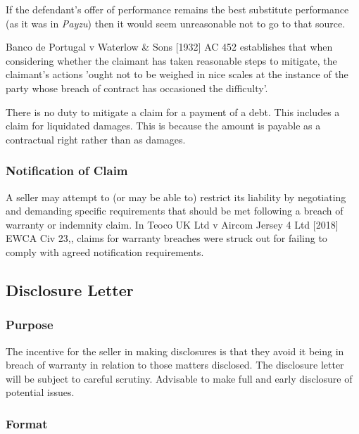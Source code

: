 \documentclass[
]{article}
\begin{document}
If the defendant's offer of performance remains the best substitute
performance (as it was in \emph{Payzu}) then it would seem unreasonable
not to go to that source.

Banco de Portugal v Waterlow \& Sons {[}1932{]} AC 452 establishes that
when considering whether the claimant has taken reasonable steps to
mitigate, the claimant's actions 'ought not to be weighed in nice scales
at the instance of the party whose breach of contract has occasioned the
difficulty'.

There is no duty to mitigate a claim for a payment of a debt. This
includes a claim for liquidated damages. This is because the amount is
payable as a contractual right rather than as damages.

\hypertarget{notification-of-claim}{%
\subsubsection{Notification of Claim}\label{notification-of-claim}}

A seller may attempt to (or may be able to) restrict its liability by
negotiating and demanding specific requirements that should be met
following a breach of warranty or indemnity claim. In Teoco UK Ltd v
Aircom Jersey 4 Ltd {[}2018{]} EWCA Civ 23,, claims for warranty
breaches were struck out for failing to comply with agreed notification
requirements.

\hypertarget{disclosure-letter}{%
\subsection{Disclosure Letter}\label{disclosure-letter}}

\hypertarget{purpose}{%
\subsubsection{Purpose}\label{purpose}}

The incentive for the seller in making disclosures is that they avoid it
being in breach of warranty in relation to those matters disclosed. The
disclosure letter will be subject to careful scrutiny. Advisable to make
full and early disclosure of potential issues.

\hypertarget{format}{%
\subsubsection{Format}\label{format}}
\end{document}
